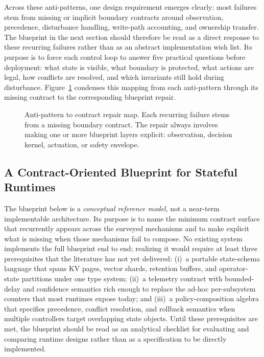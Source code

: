 \documentclass[acmsmall,screen,review]{acmart}
\begin{document}
Across these anti-patterns, one design requirement emerges clearly: most failures stem from missing or implicit boundary contracts around observation, precedence, disturbance handling, write-path accounting, and ownership transfer. The blueprint in the next section should therefore be read as a direct response to these recurring failures rather than as an abstract implementation wish list. Its purpose is to force each control loop to answer five practical questions before deployment: what state is visible, what boundary is protected, what actions are legal, how conflicts are resolved, and which invariants still hold during disturbance. Figure~\ref{fig:antipattern-map} condenses this mapping from each anti-pattern through its missing contract to the corresponding blueprint repair.

\begin{figure}[t]
\centering
\resizebox{0.96\textwidth}{!}{}
\caption{Anti-pattern to contract repair map. Each recurring failure stems from a missing boundary contract. The repair always involves making one or more blueprint layers explicit: observation, decision kernel, actuation, or safety envelope.}
\label{fig:antipattern-map}
\end{figure}

\subsection{A Contract-Oriented Blueprint for Stateful Runtimes}

The blueprint below is a \emph{conceptual reference model}, not a near-term implementable architecture. Its purpose is to name the minimum contract surface that recurrently appears across the surveyed mechanisms and to make explicit what is missing when those mechanisms fail to compose. No existing system implements the full blueprint end to end; realizing it would require at least three prerequisites that the literature has not yet delivered: (i)~a portable state-schema language that spans KV pages, vector shards, retention buffers, and operator-state partitions under one type system; (ii)~a telemetry contract with bounded-delay and confidence semantics rich enough to replace the ad-hoc per-subsystem counters that most runtimes expose today; and (iii)~a policy-composition algebra that specifies precedence, conflict resolution, and rollback semantics when multiple controllers target overlapping state objects. Until these prerequisites are met, the blueprint should be read as an analytical checklist for evaluating and comparing runtime designs rather than as a specification to be directly implemented.
\end{document}
